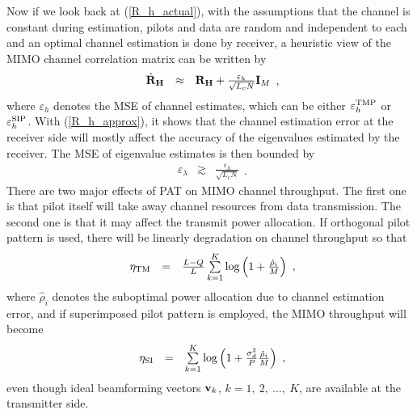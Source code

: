 \documentclass[10pt,fleqn, twocolumn]{IEEEtran}
\newcommand{\bH}{{\bf H}}
\newcommand{\bv}{{\bf v}}
\newcommand{\bI}{{\bf I}}
\newcommand{\bR}{{\bf R}}
\begin{document}
Now if we look back at (\ref{R_h_actual}), with the assumptions
that the channel is constant during estimation, pilots and data
are random and independent to each and an optimal channel
estimation is done by receiver, a heuristic view of the MIMO
channel correlation matrix can be written by
\begin{equation}
\begin{array}{rcl}
\hat{\bR}_{\bH}&\approx&\bR_{\bH}+\frac{\varepsilon_{h}}{\sqrt{L_{c}N}}\bI_{M}
\end{array},\label{R_h_approx}
\end{equation}
\noindent where $\varepsilon_{h}$ denotes the MSE of channel
estimates, which can be either $\varepsilon_{h}^{\rm TMP}$ or
$\varepsilon_{h}^{\rm SIP}$. With (\ref{R_h_approx}), it shows
that the channel estimation error at the receiver side will mostly
affect the accuracy of the eigenvalues estimated by the receiver.
The MSE of eigenvalue estimates is then bounded by
\begin{equation}
\begin{array}{rcl}
\varepsilon_{\lambda}&\gtrsim&\frac{\varepsilon_{h}}{\sqrt{L_{c}N}}
\end{array}.\label{eigenvalue_bound}
\end{equation}
There are two major effects of PAT on MIMO channel throughput. The
first one is that pilot itself will take away channel resources
from data transmission. The second one is that it may affect the
transmit power allocation. If orthogonal pilot pattern is used,
there will be linearly degradation on channel throughput so that
\begin{equation}%
\begin{array}{rcl}
\eta_{\rm TM}& =&\frac{L-Q}{L}
\sum\limits_{k=1}^{K}\log\left(1+\frac{\hat{\rho}_{i}}{M}\right)
\end{array},\label{spectral_eff_TM}
\end{equation}
\noindent where $\hat{\rho}_{i}$ denotes the suboptimal power
allocation due to channel estimation error, and if superimposed pilot
pattern is employed, the MIMO throughput will become
\begin{equation}%
\begin{array}{rcl}
\eta_{\rm
SI}&=&\sum\limits_{k=1}^{K}\log\left(1+\frac{\sigma_{d}^{2}}{P}\frac{\hat{\rho}_{i}}{M}\right)
\end{array},\label{spectral_eff_SI}
\end{equation}
\noindent even though ideal beamforming vectors $\bv_{k}$, $k=1,\ 2,\ \ldots,\ K$, are available at the transmitter side.
\end{document}

